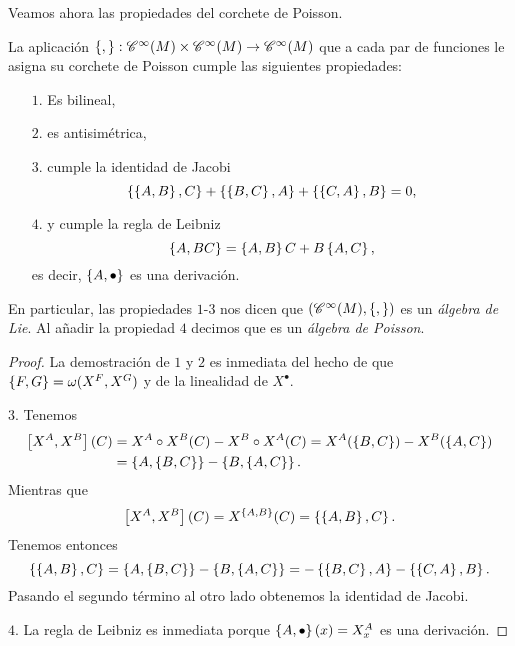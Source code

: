   Veamos ahora las propiedades del corchete de Poisson.
  \begin{prop}
    La aplicación $\left\lbrace , \right\rbrace:\mathscr{C}^{\infty}(M)\times\mathscr{C}^{\infty}(M) \rightarrow \mathscr{C}^{\infty}(M)$ que a cada par de funciones le asigna su corchete de Poisson cumple las siguientes propiedades:
\begin{enumerate}
  \item[$1.$] Es bilineal,
  \item[$2.$] es antisimétrica,
  \item[$3.$]  cumple la identidad de Jacobi
 \begin{equation*}
   \left\lbrace\left\lbrace A,B\right\rbrace,C\right\rbrace+ \left\lbrace\left\lbrace B,C\right\rbrace,A\right\rbrace + \left\lbrace\left\lbrace C,A\right\rbrace,B\right\rbrace=0,
 \end{equation*}
 \item[$4.$] y cumple la regla de Leibniz
   \begin{equation*}
     \left\lbrace A,BC\right\rbrace=\left\lbrace A,B\right\rbrace C+B\left\lbrace A,C\right\rbrace,
   \end{equation*}
   es decir, $\left\lbrace A,\bullet\right\rbrace$ es una derivación.
\end{enumerate}
En particular, las propiedades $1$-$3$ nos dicen que $(\mathscr{C}^{\infty}(M),\left\lbrace , \right\rbrace)$ es un \emph{álgebra de Lie}. Al añadir la propiedad $4$ decimos que es un \emph{álgebra de Poisson}. 
  \end{prop}
  \begin{proof}
    La demostración de $1$ y $2$ es inmediata del hecho de que $\left\lbrace F,G\right\rbrace=\omega(X^F,X^G)$ y de la linealidad de $X^{\bullet}$.

    $3$. Tenemos 
   \begin{align*}
     \left[X^A,X^B\right] (C) & = X^A\circ X^B (C) - X^B\circ X^A (C)  = X^A(\left\lbrace B,C\right\rbrace)-X^B(\left\lbrace A,C\right\rbrace) \\
     &= \left\lbrace A,\left\lbrace B,C\right\rbrace\right\rbrace-\left\lbrace B,\left\lbrace A,C\right\rbrace\right\rbrace.
   \end{align*}
   Mientras que
   \begin{equation*}
     \left[X^A,X^B\right](C)=X^{\left\lbrace A,B\right\rbrace}(C)=\left\lbrace\left\lbrace A,B\right\rbrace,C\right\rbrace.
   \end{equation*}
   Tenemos entonces
   \begin{equation*}
     \left\lbrace\left\lbrace A,B\right\rbrace,C\right\rbrace=\left\lbrace A,\left\lbrace B,C\right\rbrace\right\rbrace-\left\lbrace B,\left\lbrace A,C\right\rbrace\right\rbrace=-\left\lbrace\left\lbrace B,C\right\rbrace,A\right\rbrace-\left\lbrace\left\lbrace C,A\right\rbrace,B\right\rbrace.
   \end{equation*}
   Pasando el segundo término al otro lado obtenemos la identidad de Jacobi.
    
   $4$. La regla de Leibniz es inmediata porque $\left\lbrace A,\bullet\right\rbrace(x)=X^A_x$ es una derivación.
  \end{proof}

